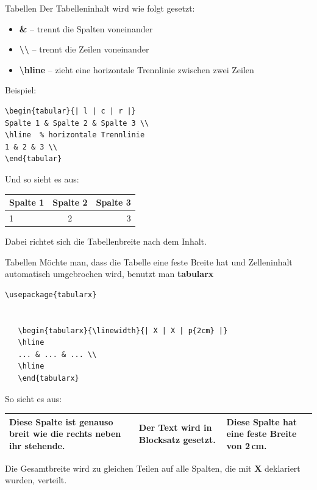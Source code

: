 \begin{frame}[fragile]{Tabellen}
Der Tabelleninhalt wird wie folgt gesetzt:
\begin{itemize}
\item \textbf{\&} -- trennt die Spalten voneinander
\item \textbf{\textbackslash\textbackslash} -- trennt die Zeilen voneinander
\item \textbf{\textbackslash hline} -- zieht eine horizontale Trennlinie zwischen zwei Zeilen
\end{itemize}

Beispiel:
\begin{lstlisting}[style=tex]
\begin{tabular}{| l | c | r |}
Spalte 1 & Spalte 2 & Spalte 3 \\
\hline  % horizontale Trennlinie
1 & 2 & 3 \\
\end{tabular}
\end{lstlisting}

\bigskip
Und so sieht es aus:
\renewcommand{\arraystretch}{1.2}
\begin{tabular}{| l | c | r |}
Spalte 1 & Spalte 2 & Spalte 3 \\
\hline
1 & 2 & 3 \\
\end{tabular}

\bigskip
Dabei richtet sich die Tabellenbreite nach dem Inhalt.
\end{frame}

\begin{frame}[fragile]{Tabellen}
Möchte man, dass die Tabelle eine feste Breite hat und Zelleninhalt automatisch umgebrochen wird, benutzt man \textbf{tabularx}
\begin{lstlisting}[style=tex]
\usepackage{tabularx}


   \begin{tabularx}{\linewidth}{| X | X | p{2cm} |}
   \hline
   ... & ... & ... \\
   \hline
   \end{tabularx}

\end{lstlisting}%

So sieht es aus:\vspace{3pt}
\begin{tabularx}{\linewidth}{| X | X | p{2cm} |}
\hline
Diese Spalte ist genauso breit wie die rechts neben ihr stehende. & Der Text wird in Blocksatz gesetzt.  & Diese Spalte hat eine feste Breite von 2\,cm. \\
\hline
\end{tabularx}

\bigskip
Die Gesamtbreite wird zu gleichen Teilen auf alle Spalten, die mit \textbf{X} deklariert wurden, verteilt.
\end{frame}

